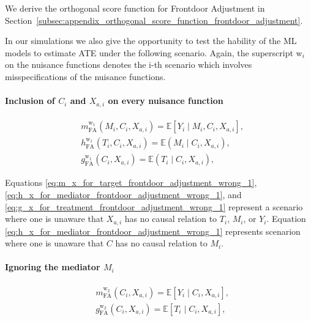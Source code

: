 \documentclass{article}
\numberwithin{equation}{section}
\begin{document}
We derive the orthogonal score function for Frontdoor Adjustment in Section~\ref{subsec:appendix_orthogonal_score_function_frontdoor_adjustment}.

In our simulations we also give the opportunity to test the hability of the ML models to estimate ATE under the following scenario. Again, the superscript $\text{w}_i$ on the nuisance functions denotes the i-th scenario which involves misspecifications of the nuisance functions.

\paragraph{Inclusion of $C_i$ and $X_{a, i}$ on every nuisance function}

\begin{align}
    & m_{\text{FA}}^{\text{w}_1}(M_i, C_i, X_{a, i}) = \mathbb{E}[Y_i \mid M_i, C_i, X_{a, i}],
    \label{eq:m_x_for_target_frontdoor_adjustment_wrong_1} \\
    & h_{\text{FA}}^{\text{w}_1}(T_i, C_i, X_{a, i}) = \mathbb{E}(M_i \mid C_i, X_{a, i}),
    \label{eq:h_x_for_mediator_frontdoor_adjustment_wrong_1} \\
    & g_{\text{FA}}^{\text{w}_1}(C_i, X_{a, i}) = \mathbb{E}(T_i \mid C_i, X_{a, i}),
    \label{eq:g_x_for_treatment_frontdoor_adjustment_wrong_1}
\end{align}

Equations \eqref{eq:m_x_for_target_frontdoor_adjustment_wrong_1}, \eqref{eq:h_x_for_mediator_frontdoor_adjustment_wrong_1}, and \eqref{eq:g_x_for_treatment_frontdoor_adjustment_wrong_1} represent a scenario where one is unaware that $X_{a, i}$ has no causal relation to $T_i$, $M_i$, or $Y_i$. Equation \eqref{eq:h_x_for_mediator_frontdoor_adjustment_wrong_1} represents scenarion where one is unaware that $C$ has no causal relation to $M_i$.

\paragraph{Ignoring the mediator $M_i$}

\begin{align}
    & m_{\text{FA}}^{\text{w}_2}(C_i, X_{a, i}) = \mathbb{E}[Y_i \mid C_i, X_{a, i}],
    \label{eq:m_x_for_target_frontdoor_adjustment_wrong_2} \\
    & g_{\text{FA}}^{\text{w}_2}(C_i, X_{a, i}) = \mathbb{E}[T_i \mid C_i, X_{a, i}],
    \label{eq:g_x_for_treatment_frontdoor_adjustment_wrong_2}
\end{align}
\end{document}

